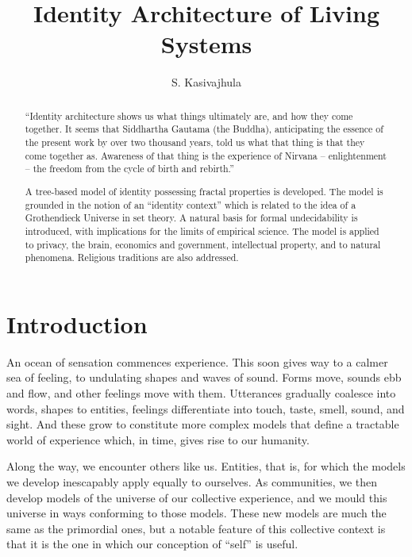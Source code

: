 \documentclass[pra,twocolumn,groupedaddress,10pt]{revtex4}
\theoremstyle{definition}
\begin{document}
\title{Identity Architecture of Living Systems}
\author{S. Kasivajhula}
{}

\begin{abstract}

``Identity architecture shows us what things ultimately are, and how they come together. It seems that Siddhartha Gautama (the Buddha), anticipating the essence of the present work by over two thousand years, told us what that thing is that they come together as. Awareness of that thing is the experience of Nirvana -- enlightenment -- the freedom from the cycle of birth and rebirth.''

A tree-based model of identity possessing fractal properties is developed. The model is grounded in the notion of an ``identity context'' which is related to the idea of a Grothendieck Universe in set theory. A natural basis for formal undecidability is introduced, with implications for the limits of empirical science. The model is applied to privacy, the brain, economics and government, intellectual property, and to natural phenomena. Religious traditions are also addressed.

\end{abstract}

\maketitle


\section{Introduction} \label{sec:introduction}

An ocean of sensation commences experience. This soon gives way to a calmer sea of feeling, to undulating shapes and waves of sound. Forms move, sounds ebb and flow, and other feelings move with them. Utterances gradually coalesce into words, shapes to entities, feelings differentiate into touch, taste, smell, sound, and sight. And these grow to constitute more complex models that define a tractable world of experience which, in time, gives rise to our humanity.

Along the way, we encounter others like us. Entities, that is, for which the models we develop inescapably apply equally to ourselves. As communities, we then develop models of the universe of our collective experience, and we mould this universe in ways conforming to those models. These new models are much the same as the primordial ones, but a notable feature of this collective context is that it is the one in which our conception of ``self'' is useful.
\end{document}
